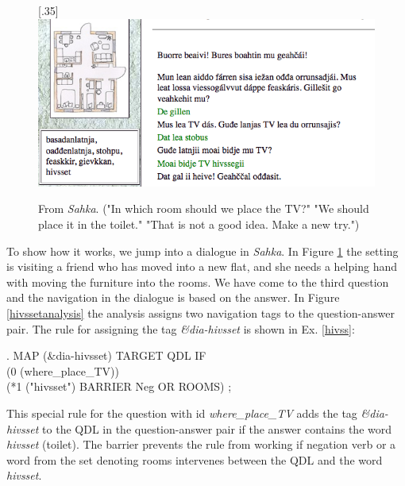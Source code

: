 \documentclass[11pt]{article}
\begin{document}
\begin{figure}[htbp]
\begin{center}
\scalebox{.35}[.35]{\includegraphics{presentation/img/TVhivssegii.png}}\\
\caption{From \textit{Sahka}. ("In which room should we place the TV?" "We should place it in the toilet." "That is not a good idea. Make a new try.")
}
\label{sahka}
\end{center}
\end{figure}


To show how it works, we jump into a dialogue in \textit{Sahka}. In Figure \ref{sahka} the setting is visiting a friend who has moved into a new flat, and she needs a helping hand with moving the furniture into the rooms. We have come to the third question and the navigation in the dialogue is based on the answer. In Figure \ref{hivssetanalysis} the analysis assigns two navigation tags to the question-answer pair. 
The rule for assigning the tag \textit{\&dia-hivsset} is shown in Ex. \ref{hivss}:

\ex.\flushleft \label{hivss} \small MAP (\&dia-hivsset) TARGET QDL IF \\
     (0 (where\_place\_TV))\\(*1 ("hivsset") BARRIER Neg OR ROOMS) ;

This special rule for the question with id \textit{where\_place\_TV} adds the tag \textit{\&dia-hivsset} to the QDL in the question-answer pair if the answer contains the word \textit{hivsset} (toilet). The barrier prevents the rule from working if negation verb or a word from the set denoting rooms intervenes between the QDL and the word \textit{hivsset}. \\
\end{document}
